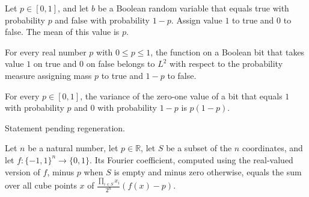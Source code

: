 \begin{theorem}
\label{FABL.integral_zeroOneValue_pBiasedBitPMF}
\leanok
{}
Let $p\in[0,1]$, and let $b$ be a Boolean random variable that equals true with
probability $p$ and false with probability $1-p$. Assign value $1$ to true and $0$ to
false. The mean of this value is $p$.
\end{theorem}

\begin{theorem}
\label{FABL.zeroOneValue_memLp_pBiasedBitPMF}
\leanok
{}
For every real number $p$ with $0\le p\le 1$, the function on a Boolean bit that takes
value $1$ on true and $0$ on false belongs to $L^2$ with respect to the probability
measure assigning mass $p$ to true and $1-p$ to false.
\end{theorem}

\begin{theorem}
\label{FABL.variance_zeroOneValue_pBiasedBitPMF}
\leanok
{}
For every $p\in[0,1]$, the variance of the zero-one value of a bit that equals $1$ with
probability $p$ and $0$ with probability $1-p$ is $p(1-p)$.
\end{theorem}

\begin{theorem}
\label{FABL.measure_abs_pBiasedWeightedSum_sub_mean_ge_le}
\leanok
{}
Statement pending regeneration.
\end{theorem}

\begin{theorem}
\label{FABL.fourierCoeff_sub_pBiasedMean_eq_weightedCenteredSum}
\leanok
{}
Let $n$ be a natural number, let $p\in\mathbb R$, let $S$ be a subset of the $n$
coordinates, and let $f:\{-1,1\}^n\to\{0,1\}$. Its Fourier coefficient, computed
using the real-valued version of $f$, minus $p$ when $S$ is empty and minus zero
otherwise, equals the sum over all cube points $x$ of $\frac{\prod_{i\in
S}x_i}{2^n}(f(x)-p)$.
\end{theorem}

